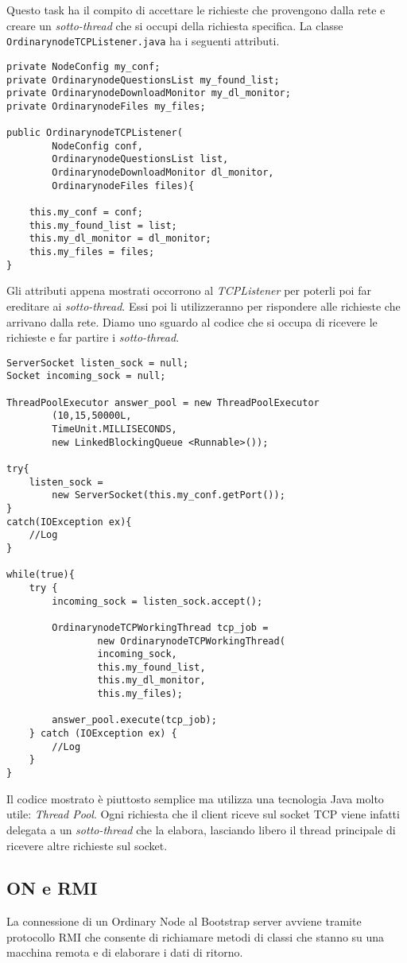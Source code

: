 Questo task ha il compito di accettare le richieste che provengono dalla rete e creare un \emph{sotto-thread} che si occupi della richiesta specifica.
La classe \verb|OrdinarynodeTCPListener.java| ha i seguenti attributi.
\begin{lstlisting}
private NodeConfig my_conf;
private OrdinarynodeQuestionsList my_found_list;
private OrdinarynodeDownloadMonitor my_dl_monitor;
private OrdinarynodeFiles my_files;

public OrdinarynodeTCPListener(
		NodeConfig conf,
		OrdinarynodeQuestionsList list,
		OrdinarynodeDownloadMonitor dl_monitor,
		OrdinarynodeFiles files){

	this.my_conf = conf;
	this.my_found_list = list;
	this.my_dl_monitor = dl_monitor;
	this.my_files = files;
}
\end{lstlisting}
Gli attributi appena mostrati occorrono al \emph{TCPListener} per poterli poi far ereditare ai \emph{sotto-thread}. Essi poi li utilizzeranno per rispondere alle richieste che arrivano dalla rete.
Diamo uno sguardo al codice che si occupa di ricevere le richieste e far partire i \emph{sotto-thread}.
\begin{lstlisting}
ServerSocket listen_sock = null;
Socket incoming_sock = null;

ThreadPoolExecutor answer_pool = new ThreadPoolExecutor
		(10,15,50000L,
		TimeUnit.MILLISECONDS, 
		new LinkedBlockingQueue <Runnable>());

try{
	listen_sock = 
		new ServerSocket(this.my_conf.getPort());
}
catch(IOException ex){
	//Log
}

while(true){
	try {
		incoming_sock = listen_sock.accept();
		
		OrdinarynodeTCPWorkingThread tcp_job = 
				new OrdinarynodeTCPWorkingThread(
				incoming_sock,
				this.my_found_list,
				this.my_dl_monitor,
				this.my_files);

		answer_pool.execute(tcp_job);
	} catch (IOException ex) {
		//Log
	}
}
\end{lstlisting}
Il codice mostrato è piuttosto semplice ma utilizza una tecnologia Java molto utile: \emph{Thread Pool}.
Ogni richiesta che il client riceve sul socket TCP viene infatti delegata a un \emph{sotto-thread} che la elabora, lasciando libero il thread principale di ricevere altre richieste sul socket.

\subsection{ON e RMI}
La connessione di un Ordinary Node al Bootstrap server avviene tramite protocollo RMI che consente di richiamare metodi di classi che stanno su una macchina remota e di elaborare i dati di ritorno.

